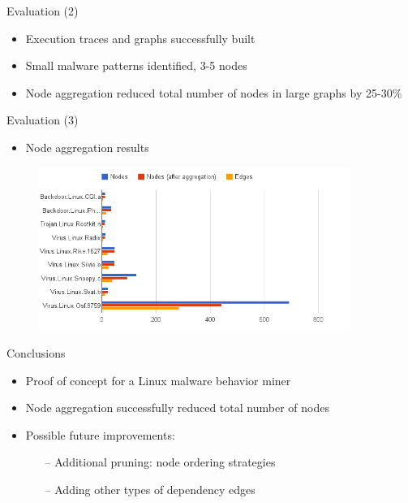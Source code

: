\documentclass{beamer}
\begin{document}
\begin{frame}{Evaluation (2)}
  \begin{itemize}
    \item Execution traces and graphs successfully built
    \item Small malware patterns identified, 3-5 nodes
    \item Node aggregation reduced total number of nodes in large graphs by 25-30\%
  \end{itemize}
\end{frame}

\begin{frame}{Evaluation (3)}
  \begin{itemize}
    \item Node aggregation results
  \end{itemize}
  \begin{figure}[p]
    \includegraphics[width=4in]{img/node-aggregation-android.png}
  \end{figure}
\end{frame}

\begin{frame}{Conclusions}
  \begin{itemize}
    \item Proof of concept for a Linux malware behavior miner
    \item Node aggregation successfully reduced total number of nodes
    \item Possible future improvements:
    \begin{itemize}
      \item[--] Additional pruning: node ordering strategies
      \item[--] Adding other types of dependency edges
    \end{itemize}
  \end{itemize}
\end{frame}

\end{document}
